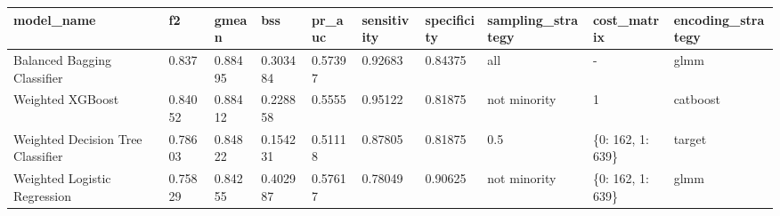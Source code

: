 \begin{tabular}{|l|l|l|l|l|l|l|l|l|l|}
\hline
\textbf{model\_name}              & \textbf{f2} & \textbf{gmean} & \textbf{bss} & \textbf{pr\_auc} & \textbf{sensitivity} & \textbf{specificity} & \textbf{sampling\_strategy} & \textbf{cost\_matrix} & \textbf{encoding\_strategy} \\ \hline
Balanced Bagging Classifier       & 0.837       & 0.88495        & 0.303484     & 0.57397          & 0.92683              & 0.84375              & all                         & -                     & glmm                        \\ \hline
Weighted XGBoost                  & 0.84052     & 0.88412        & 0.228858     & 0.5555           & 0.95122              & 0.81875              & not minority                & 1                     & catboost                    \\ \hline
Weighted Decision Tree Classifier & 0.78603     & 0.84822        & 0.154231     & 0.51118          & 0.87805              & 0.81875              & 0.5                         & \{0: 162, 1: 639\}    & target                      \\ \hline
Weighted Logistic Regression      & 0.75829     & 0.84255        & 0.402987     & 0.57617          & 0.78049              & 0.90625              & not minority                & \{0: 162, 1: 639\}    & glmm                        \\ \hline
\end{tabular}